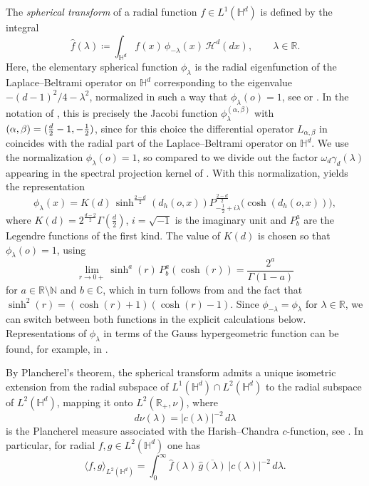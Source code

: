 \documentclass[11pt,a4paper]{article}
\theoremstyle{plain}
\theoremstyle{definition}
\theoremstyle{remark}
\def\CC{\mathbb{C}}
\def\HH{\mathbb{H}}
\def\NN{\mathbb{N}}
\def\RR{\mathbb{R}}
\def\cH{\mathcal{H}}
\begin{document}
The \emph{spherical transform} of a radial function $f\in L^1(\HH^d)$ is defined by the integral
\[
\widehat f(\lambda) \coloneqq \int_{\HH^d} f(x)\,\phi_{-\lambda}(x)\,\cH^d(dx),\qquad \lambda\in\RR.
\]
Here, the elementary spherical function $\phi_\lambda$ is the radial eigenfunction of the Laplace--Beltrami operator on $\HH^d$ corresponding to the eigenvalue $-(d-1)^2/4-\lambda^2$, normalized in such a way that $\phi_\lambda(o)=1$, see \cite[Equation (1.2')]{Strichartz} or \cite[page 357]{Faraut}. In the notation of \cite{Koornwinder}, this is precisely the Jacobi function $\phi_\lambda^{(\alpha,\beta)}$ with $(\alpha,\beta)=({d\over 2}-1,-{1\over 2})$,
since for this choice the differential operator $L_{\alpha,\beta}$ in \cite{Koornwinder} coincides with the radial part of the Laplace--Beltrami operator on $\HH^d$. We use the normalization $\phi_\lambda(o)=1$, so compared to \cite[Equations (4.3) and (4.5)]{Strichartz} we divide out the factor $\omega_d\gamma_d(\lambda)$ appearing in the spectral projection kernel of \cite{Strichartz}. With this normalization, \cite[Equation (4.5)]{Strichartz} yields the representation
\[
\phi_\lambda(x)
=K(d)\,\sinh^{\frac{2-d}{2}}(d_h(o,x))
P_{-\frac12+i\lambda}^{\frac{2-d}{2}}\!\bigl(\cosh(d_h(o,x))\bigr),
\]
where $K(d)=2^{\frac{d-2}{2}}\Gamma\!\left(\frac d2\right)$, $i=\sqrt{-1}$ is the imaginary unit and $P_b^a$ are the Legendre functions of the first kind. The value of $K(d)$ is chosen so that $\phi_\lambda(o)=1$, using
\[
\lim_{r\to 0+}\sinh^a(r)\,P_b^a(\cosh(r)) = \frac{2^a}{\Gamma(1-a)}
\]
for $a\in\RR\setminus\NN$ and $b\in\CC$, which in turn follows from \cite[Formula 14.8.7]{NIST} and the fact that $\sinh^2(r)=(\cosh(r)+1)(\cosh(r)-1)$. Since $\phi_{-\lambda}=\phi_\lambda$ for $\lambda\in\RR$, we can switch between both functions in the explicit calculations below. Representations of $\phi_\lambda$ in terms of the Gauss hypergeometric function can be found, for example, in \cite{Koornwinder,Strichartz,Wolf}.

By Plancherel's theorem, the spherical transform admits a unique isometric extension from the radial subspace of $L^1(\HH^d)\cap L^2(\HH^d)$ to the radial subspace of $L^2(\HH^d)$, mapping it onto $L^2(\RR_+,\nu)$, where
\[
d\nu(\lambda)=|c(\lambda)|^{-2}\,d\lambda
\]
is the Plancherel measure associated with the Harish--Chandra $c$-function, see \cite[Theoreme IV.2]{Faraut}.
In particular, for radial $f,g\in L^2(\HH^d)$ one has
\begin{equation}\label{eq:Plancherel}
	\langle f,g\rangle_{L^2(\HH^d)}
	=
	\int_0^\infty \widehat f(\lambda)\,\overline{\widehat g(\lambda)}\,|c(\lambda)|^{-2}\,d\lambda.
\end{equation}
\end{document}
